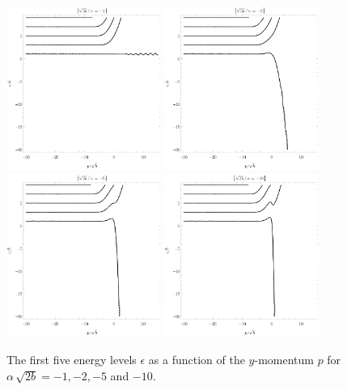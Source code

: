 \begin{figure}[p]
    \centering
    \noindent
    \includegraphics[width=0.45\textwidth]{grafy/robin-1.pdf}%
    \hspace{0.1\textwidth}%
    \includegraphics[width=0.45\textwidth]{grafy/robin-2.pdf}%
    \\[2em]%
    \includegraphics[width=0.45\textwidth]{grafy/robin-5.pdf}%
    \hspace{0.1\textwidth}%
    \includegraphics[width=0.45\textwidth]{grafy/robin-10.pdf}\par
    \caption{The first five energy levels $\epsilon$ as a function of the $y$-momentum $p$ for $\alpha\,\sqrt{2b} = -1, -2, -5$ and $-10$.}
    \label{plots-robin-negative}
\end{figure}
